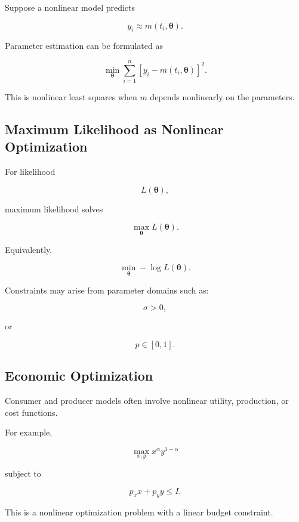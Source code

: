Suppose a nonlinear model predicts

\[
y_i
\approx
m(t_i,\boldsymbol{\theta}).
\]

Parameter estimation can be formulated as

\[
\boxed{
\min_{\boldsymbol{\theta}}
\sum_{i=1}^{n}
\left[
y_i
-
m(t_i,\boldsymbol{\theta})
\right]^2.
}
\]

This is nonlinear least squares when \(m\) depends nonlinearly on the
parameters.

\subsection{Maximum Likelihood as Nonlinear Optimization}
\label{subsec:nlp-maximum-likelihood}

For likelihood

\[
L(\boldsymbol{\theta}),
\]

maximum likelihood solves

\[
\boxed{
\max_{\boldsymbol{\theta}}
L(\boldsymbol{\theta}).
}
\]

Equivalently,

\[
\boxed{
\min_{\boldsymbol{\theta}}
-
\log
L(\boldsymbol{\theta}).
}
\]

Constraints may arise from parameter domains such as:

\[
\boxed{
\sigma>0,
}
\]

or

\[
\boxed{
p\in[0,1].
}
\]

\subsection{Economic Optimization}
\label{subsec:nlp-economic-optimization}

Consumer and producer models often involve nonlinear utility, production,
or cost functions.

For example,

\[
\boxed{
\max_{x,y}
x^\alpha y^{1-\alpha}
}
\]

subject to

\[
\boxed{
p_xx+p_yy\leq I.
}
\]

This is a nonlinear optimization problem with a linear budget constraint.

